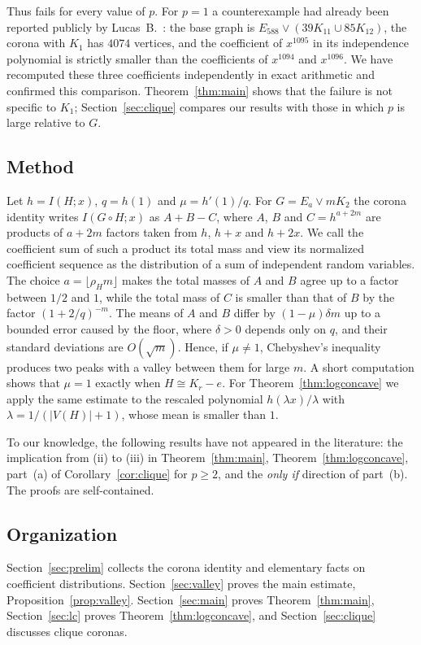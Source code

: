 \documentclass[11pt]{amsart}
\theoremstyle{remark}
\numberwithin{equation}{section}
\newcommand{\cor}{\circ}
\begin{document}
Thus \cite[Conjecture~6.1]{HLMP-clique} fails for every value of $p$. For $p=1$ a counterexample had already been reported publicly by Lucas~B.~\cite{LucasB}: the base graph is $E_{588}\vee(39K_{11}\cup 85K_{12})$, the corona with $K_1$ has $4074$ vertices, and the coefficient of $x^{1095}$ in its independence polynomial is strictly smaller than the coefficients of $x^{1094}$ and $x^{1096}$. We have recomputed these three coefficients independently in exact arithmetic and confirmed this comparison. Theorem~\ref{thm:main} shows that the failure is not specific to $K_1$; Section~\ref{sec:clique} compares our results with those in which $p$ is large relative to $G$.

\subsection*{Method}
Let $h=I(H;x)$, $q=h(1)$ and $\mu=h'(1)/q$. For $G=E_a\vee mK_2$ the corona identity writes $I(G\cor H;x)$ as $A+B-C$, where $A$, $B$ and $C=h^{a+2m}$ are products of $a+2m$ factors taken from $h$, $h+x$ and $h+2x$. We call the coefficient sum of such a product its total mass and view its normalized coefficient sequence as the distribution of a sum of independent random variables. The choice $a=\lfloor\rho_H m\rfloor$ makes the total masses of $A$ and $B$ agree up to a factor between $1/2$ and $1$, while the total mass of $C$ is smaller than that of $B$ by the factor $(1+2/q)^{-m}$. The means of $A$ and $B$ differ by $(1-\mu)\delta m$ up to a bounded error caused by the floor, where $\delta>0$ depends only on $q$, and their standard deviations are $O(\sqrt m)$. Hence, if $\mu\ne 1$, Chebyshev's inequality produces two peaks with a valley between them for large $m$. A short computation shows that $\mu=1$ exactly when $H\cong K_r-e$. For Theorem~\ref{thm:logconcave} we apply the same estimate to the rescaled polynomial $h(\lambda x)/\lambda$ with $\lambda=1/(|V(H)|+1)$, whose mean is smaller than $1$.

To our knowledge, the following results have not appeared in the literature: the implication from (ii) to (iii) in Theorem~\ref{thm:main}, Theorem~\ref{thm:logconcave}, part~(a) of Corollary~\ref{cor:clique} for $p\ge 2$, and the \emph{only if} direction of part~(b). The proofs are self-contained.

\subsection*{Organization}
Section~\ref{sec:prelim} collects the corona identity and elementary facts on coefficient distributions. Section~\ref{sec:valley} proves the main estimate, Proposition~\ref{prop:valley}. Section~\ref{sec:main} proves Theorem~\ref{thm:main}, Section~\ref{sec:lc} proves Theorem~\ref{thm:logconcave}, and Section~\ref{sec:clique} discusses clique coronas.
\end{document}
